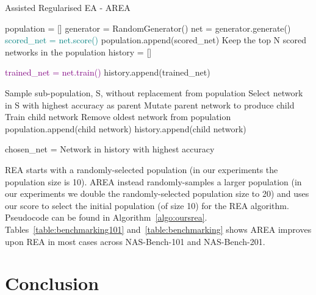 \documentclass{article}
\begin{document}
\vspace{-2mm}
{\tiny
      \begin{algorithm}[H]
    \caption{Assisted Regularised EA - AREA}
    \begin{algorithmic}[h]
           \State  population = []
                 \State  generator = RandomGenerator()
              \State net = generator.generate() 
              \State \textcolor{teal}{scored\_net = net.score()}
              \State population.append(scored\_net)
          \EndFor
          \State Keep the top N scored networks in the population
          \State history = []
              
              \State \textcolor{purple}{trained\_net = net.train()}
              \State history.append(trained\_net)
          \EndFor
               
               \State Sample sub-population, S, without replacement from population
               \State Select network in S with highest accuracy as parent
               \State Mutate parent network to produce child
               \State Train child network
               \State Remove oldest network from population 
               \State population.append(child network)
               \State history.append(child network)
               
          \EndWhile
    \State chosen\_net = Network in history with highest accuracy
    \end{algorithmic}
    
    \label{algo:oursrea}
    \end{algorithm}
}


REA starts with a randomly-selected population (in our experiments the population size is 10). AREA instead randomly-samples a larger population (in our experiments we double the randomly-selected population size to 20) and uses our score to select the initial population (of size 10) for the REA algorithm. Pseudocode can be found in Algorithm~\ref{algo:oursrea}. Tables~\ref{table:benchmarking101} and~\ref{table:benchmarking} shows AREA improves upon REA in most cases across NAS-Bench-101 and NAS-Bench-201.


\section{Conclusion}
\end{document}
